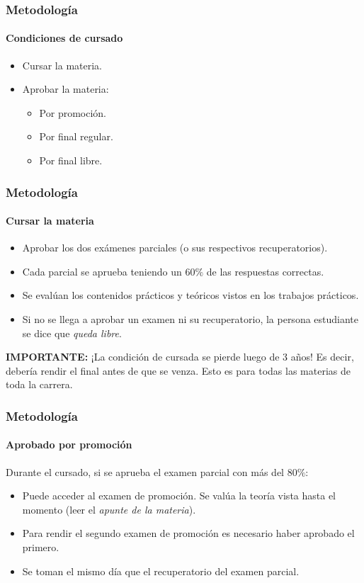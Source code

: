 \documentclass[11pt,a4paper,spanish]{beamer}
\begin{document}
\begin{frame}

    \frametitle{Metodología}
    \framesubtitle{Condiciones de cursado}

\begin{itemize}
    \item Cursar la materia.
    \item Aprobar la materia:
        \begin{itemize}
            \item Por promoción.
            \item Por final regular.
            \item Por final libre.
        \end{itemize}
\end{itemize}

\end{frame}

\begin{frame}

    \frametitle{Metodología}
    \framesubtitle{Cursar la materia}

\begin{itemize}

    \item Aprobar los dos exámenes parciales (o sus respectivos
        recuperatorios).
    \item Cada parcial se aprueba teniendo un $60\%$ de las respuestas
        correctas.
    \item Se evalúan los contenidos prácticos y teóricos vistos en los
        trabajos prácticos.
    \item Si no se llega a aprobar un examen ni su recuperatorio, la persona
        estudiante se dice que \emph{queda libre}.

\end{itemize}

\textbf{IMPORTANTE:} ¡La condición de cursada se pierde luego de 3 años! Es
    decir, debería rendir el final antes de que se venza. Esto es para todas
    las materias de toda la carrera.

\end{frame}

\begin{frame}

    \frametitle{Metodología}
    \framesubtitle{Aprobado por promoción}


Durante el cursado, si se aprueba el examen parcial con más del $80\%$:

\begin{itemize}
    \item Puede acceder al examen de promoción. Se valúa la teoría vista hasta
        el momento (leer el \emph{apunte de la materia}).
    \item Para rendir el segundo examen de promoción es necesario haber
        aprobado el primero.
    \item Se toman el mismo día que el recuperatorio del examen parcial.
\end{itemize}

\end{frame}
\end{document}
